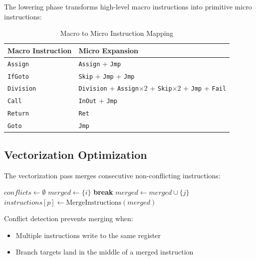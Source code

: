 \documentclass[11pt,a4paper]{article}
\begin{document}
The lowering phase transforms high-level macro instructions into primitive micro instructions:

\begin{table}[h]
\centering
\begin{tabular}{ll}
\toprule
\textbf{Macro Instruction} & \textbf{Micro Expansion} \\
\midrule
\texttt{Assign} & \texttt{Assign} + \texttt{Jmp} \\
\texttt{IfGoto} & \texttt{Skip} + \texttt{Jmp} + \texttt{Jmp} \\
\texttt{Division} & \texttt{Division} + \texttt{Assign}$\times 2$ + \texttt{Skip}$\times 2$ + \texttt{Jmp} + \texttt{Fail} \\
\texttt{Call} & \texttt{InOut} + \texttt{Jmp} \\
\texttt{Return} & \texttt{Ret} \\
\texttt{Goto} & \texttt{Jmp} \\
\bottomrule
\end{tabular}
\caption{Macro to Micro Instruction Mapping}
\end{table}

\subsection{Vectorization Optimization}

The vectorization pass merges consecutive non-conflicting instructions:

\begin{algorithm}
\caption{Instruction Vectorization}
\begin{algorithmic}[1]
        \State $conflicts \gets \emptyset$
        \State $merged \gets \{i\}$
                \State \textbf{break}
            \EndIf
            \State $merged \gets merged \cup \{j\}$
        \EndFor
        \State $instructions[p] \gets \text{MergeInstructions}(merged)$
    \EndFor
    \State \Return {}
\EndFunction
\end{algorithmic}
\end{algorithm}

Conflict detection prevents merging when:
\begin{itemize}
    \item Multiple instructions write to the same register
    \item Branch targets land in the middle of a merged instruction
\end{itemize}
\end{document}
